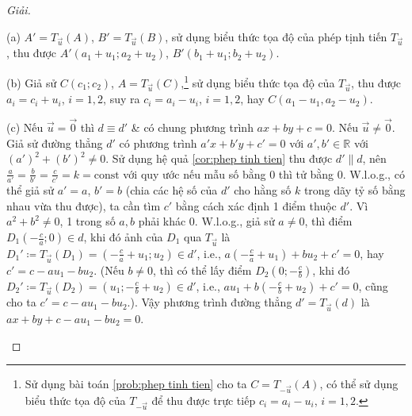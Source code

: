 \documentclass[oneside]{book}
\numberwithin{equation}{section}
\begin{document}
\begin{proof}[Giải]
	\begin{enumerate*}
		\item[(a)] $A' = T_{\vec{u}}(A)$, $B' = T_{\vec{u}}(B)$, sử dụng biểu thức tọa độ của phép tịnh tiến $T_{\vec{u}}$, thu được $A'(a_1 + u_1;a_2 + u_2)$, $B'(b_1 + u_1;b_2 + u_2)$.
		\item[(b)] Giả sử $C(c_1;c_2)$, $A = T_{\vec{u}}(C)$,\footnote{Sử dụng bài toán \ref{prob:phep tinh tien} cho ta $C = T_{-\vec{u}}(A)$, có thể sử dụng biểu thức tọa độ của $T_{-\vec{u}}$ để thu được trực tiếp $c_i = a_i - u_i$, $i = 1,2$.} sử dụng biểu thức tọa độ của $T_{\vec{u}}$, thu được $a_i = c_i + u_i$, $i = 1,2$, suy ra $c_i = a_i - u_i$, $i = 1,2$, hay $C(a_1 - u_1,a_2 - u_2)$.
		\item[(c)] Nếu $\vec{u} = \vec{0}$ thì $d\equiv d'$ \& có chung phương trình $ax + by + c = 0$. Nếu $\vec{u}\ne\vec{0}$. Giả sử đường thẳng $d'$ có phương trình $a'x + b'y + c' = 0$ với $a',b'\in\mathbb{R}$ với $(a')^2 + (b')^2\ne 0$. Sử dụng hệ quả \ref{cor:phep tinh tien} thu được $d'\parallel d$, nên $\frac{a}{a'} = \frac{b}{b'} = \frac{c}{c'} = k = \mbox{const}$ với quy ước nếu mẫu số bằng $0$ thì tử bằng $0$. W.l.o.g., có thể giả sử $a' = a$, $b' = b$ (chia các hệ số của $d'$ cho hằng số $k$ trong dãy tỷ số bằng nhau vừa thu được), ta cần tìm $c'$ bằng cách xác định 1 điểm thuộc $d'$. Vì $a^2 + b^2\ne 0$, 1 trong số $a,b$ phải khác $0$. W.l.o.g., giả sử $a\ne 0$, thì điểm $D_1\left(-\frac{c}{a};0\right)\in d$, khi đó ảnh của $D_1$ qua $T_{\vec{u}}$ là $D_1'\coloneqq T_{\vec{u}}(D_1) = \left(-\frac{c}{a} + u_1;u_2\right)\in d'$, i.e., $a\left(-\frac{c}{a} + u_1\right) + bu_2 + c' = 0$, hay $c' = c - au_1 - bu_2$. (Nếu $b\ne 0$, thì có thể lấy điểm $D_2\left(0;-\frac{c}{b}\right)$, khi đó $D_2'\coloneqq T_{\vec{u}}(D_2) = \left(u_1;-\frac{c}{b} + u_2\right)\in d'$, i.e., $au_1 + b\left(-\frac{c}{b} + u_2\right) + c' = 0$, cũng cho ta $c' = c - au_1 - bu_2$.). Vậy phương trình đường thẳng $d' = T_{\vec{u}}(d)$ là $ax + by + c - au_1 - bu_2 = 0$.
	\end{enumerate*}
\end{proof}
\end{document}
